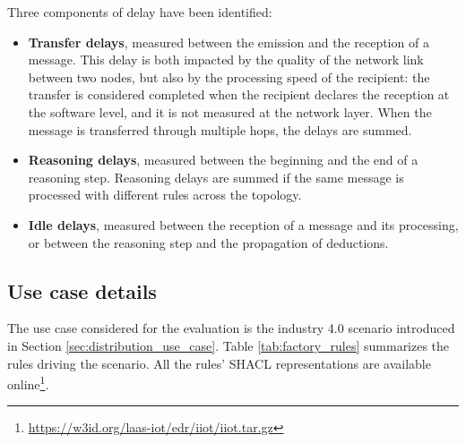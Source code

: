 \documentclass[sw]{iosart2x}
\begin{document}
Three components of delay have been identified:
\begin{itemize}
	\item \textbf{Transfer delays}, measured between the emission and the reception of a message. This delay is both impacted by the quality of the network link between two nodes, but also by the processing speed of the recipient: the transfer is considered completed when the recipient declares the reception at the software level, and it is not measured at the network layer. 
	When the message is transferred through multiple hops, the delays are summed.
	\item \textbf{Reasoning delays}, measured between the beginning and the end of a reasoning step. 
	Reasoning delays are summed if the same message is processed with different rules across the topology.
	\item \textbf{Idle delays}, measured between the reception of a message and its processing, or between the reasoning step and the propagation of deductions.
\end{itemize}

\subsection{Use case details}
\label{subs:factory_use_case}

The use case considered for the evaluation is the industry 4.0 scenario introduced in Section \textsection \ref{sec:distribution_use_case}.
Table \ref{tab:factory_rules} summarizes the rules driving the scenario. 
All the rules' SHACL representations are available online\footnote{\url{https://w3id.org/laas-iot/edr/iiot/iiot.tar.gz}}.
\end{document}
